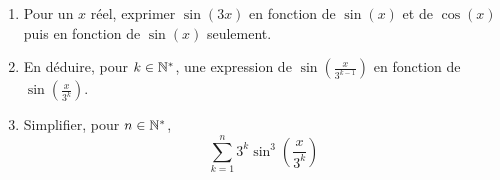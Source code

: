 \begin{enumerate}
  \item Pour un $x$ réel, exprimer $\sin(3x)$ en fonction de $\sin(x)$ et de $\cos(x)$ puis en fonction de $\sin(x)$ seulement.
  \item En déduire, pour $k\in \mathbb{N}^*$, une expression de $\sin(\frac{x}{3^{k-1}})$ en fonction de $\sin(\frac{x}{3^{k}})$.
  \item Simplifier, pour $n\in \mathbb{N}^*$,
  \begin{displaymath}
    \sum_{k=1}^n 3^{k}\sin^3(\frac{x}{3^{k}})
  \end{displaymath}

\end{enumerate}
